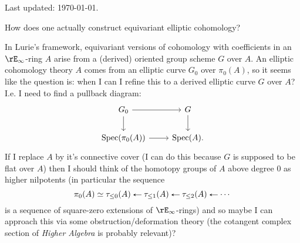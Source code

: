 



\thispagestyle{fancy}


\begin{flushleft}
  Last updated: \today.
\end{flushleft}

\medskip

\begin{idea}


\item How does one actually construct equivariant elliptic cohomology?


  \begin{idea}
  \item In Lurie's framework, equivariant versions of cohomology with
    coefficients in an $\rE_\infty$-ring $A$ arise from a (derived)
    oriented group scheme $G$ over $A$. An elliptic cohomology theory
    $A$ comes from an elliptic curve $G_0$ over $\pi_0(A)$, so it
    seems like the question is: when I can I refine this to a derived
    elliptic curve $G$ over $A$? I.e. I need to find a pullback
    diagram:
    \[
    \begin{tikzcd}
      G_0 \ar[r] \ar[d] & G \ar[d] \\
      \Spec(\pi_0(A)) \ar[r] & \Spec(A).
    \end{tikzcd}
    \]
    If I replace $A$ by it's connective cover (I can do this because
    $G$ is supposed to be flat over $A$) then I should think of the
    homotopy groups of $A$ above degree $0$ as higher nilpotents (in
    particular the sequence
    \[
    \pi_0(A) \iso \tau_{\le 0}(A) \from \tau_{\le 1}(A) \from
    \tau_{\le 2}(A) \from \cdots
    \]
    is a sequence of square-zero extensions of $\rE_\infty$-rings) and
    so maybe I can approach this via some obstruction/deformation
    theory (the cotangent complex section of \emph{Higher Algebra} is
    probably relevant)?
  \end{idea}



\end{idea}
